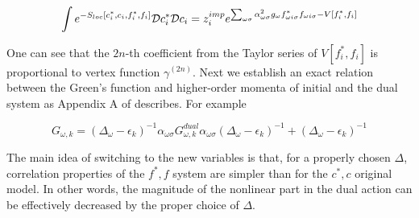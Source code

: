 \begin{equation} \int e^{-S_{loc}[c_i^*,c_i,f_i^*,f_i]}\mathcal{D} c_i^*\mathcal{D} c_i = 
  z_i^{imp}e^{\sum_{\omega\sigma}\alpha_{\omega\sigma}^2g_\omega f_{\omega i \sigma}^*f_{\omega i \sigma} - V[f_i^*,f_i]} \end{equation}

One can see that the $2n$-th coefficient from the Taylor series of $V[f_i^*,f_i]$ is proportional to vertex function $\gamma^{(2n)}$.
Next we establish an exact relation between the Green's function and higher-order momenta of initial and the dual system as Appendix A of \cite{0810.3819} describes.
For example 

\begin{equation}
 G_{\omega,k} = (\Delta_\omega-\epsilon_k)^{-1}\alpha_{\omega\sigma}G_{\omega,k}^{dual}\alpha_{\omega\sigma}(\Delta_\omega-\epsilon_k)^{-1} + (\Delta_\omega-\epsilon_k)^{-1}
\end{equation}

The main idea of switching to the new variables is that, for a properly chosen $\Delta$, correlation properties of the $f^*,f$ system are simpler than for the 
 $c^*,c$ original model. In other words, the magnitude of the nonlinear part in the dual action can be effectively decreased by the proper choice of $\Delta$.
